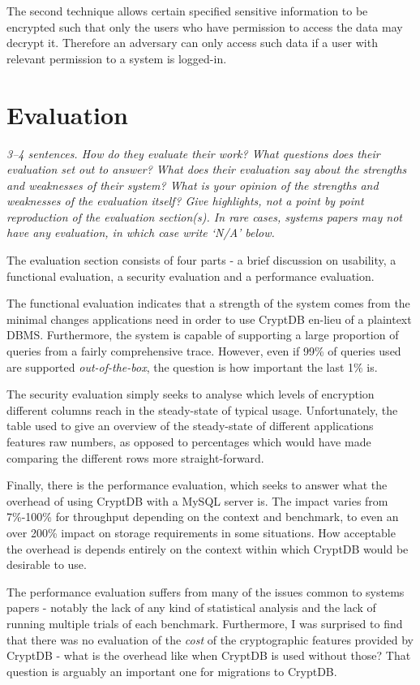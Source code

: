 \documentclass[11pt]{article}
\begin{document}
The second technique allows certain specified sensitive information to be
encrypted such that only the users who have permission to access the data may
decrypt it. Therefore an adversary can only access such data if a user with
relevant permission to a system is logged-in.


\section*{Evaluation}

\textsl{3--4 sentences. How do they evaluate their work? What questions does
their evaluation set out to answer? What does their evaluation say about the
strengths and weaknesses of their system? What is your opinion of the strengths
and weaknesses of the evaluation itself? Give highlights, not a point by point
reproduction of the evaluation section(s). In rare cases, systems papers may
not have any evaluation, in which case write `N/A' below.}

The evaluation section consists of four parts - a brief discussion on
usability, a functional evaluation, a security evaluation and a performance
evaluation.

The functional evaluation indicates that a strength of the system comes from
the minimal changes applications need in order to use CryptDB en-lieu of a
plaintext DBMS. Furthermore, the system is capable of supporting a large
proportion of queries from a fairly comprehensive trace. However, even if 99\%
of queries used are supported \textit{out-of-the-box}, the question is how
important the last 1\% is.

The security evaluation simply seeks to analyse which levels of encryption
different columns reach in the steady-state of typical usage. Unfortunately,
the table used to give an overview of the steady-state of different
applications features raw numbers, as opposed to percentages which would have
made comparing the different rows more straight-forward.

Finally, there is the performance evaluation, which seeks to answer what the
overhead of using CryptDB with a MySQL server is. The impact varies from
7\%-100\% for throughput depending on the context and benchmark, to even an
over 200\% impact on storage requirements in some situations. How acceptable
the overhead is depends entirely on the context within which CryptDB would be
desirable to use.

The performance evaluation suffers from many of the issues common to systems
papers - notably the lack of any kind of statistical analysis and the lack of
running multiple trials of each benchmark. Furthermore, I was surprised to find
that there was no evaluation of the \textit{cost} of the cryptographic features
provided by CryptDB - what is the overhead like when CryptDB is used without
those? That question is arguably an important one for migrations to CryptDB.
\end{document}
